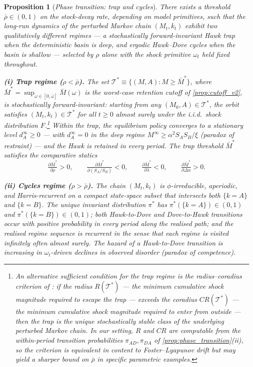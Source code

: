 \documentclass[11pt,twoside]{extarticle}
\newtheorem{proposition}{Proposition}
\begin{document}
\begin{proposition}[\emph{Phase transition: trap and cycles}]\label{prop:phase_transition}\label{prop:trap_v2}\label{prop:cycles_v2}\label{prop:cs_v2}
\emph{There exists a threshold $\bar\rho\in(0,1)$ on the stock-decay rate, depending on model primitives, such that the long-run dynamics of the perturbed Markov chain $(M_t,k_t)$ exhibit two qualitatively different regimes — a stochastically forward-invariant Hawk trap when the deterministic basin is deep, and ergodic Hawk--Dove cycles when the basin is shallow — selected by $\rho$ alone with the shock primitive $\omega_t$ held fixed throughout.}

\smallskip
\noindent\textbf{(i) Trap regime ($\rho<\bar\rho$).} The set $\mathcal T^*\equiv\{(M,A):M\ge\bar M^*\}$, where $\bar M^*=\sup_{\omega\in[0,\bar\omega]}\bar M(\omega)$ is the worst-case retention cutoff of \autoref{prop:cutoff_v2}, is stochastically forward-invariant: starting from any $(M_0,A)\in\mathcal T^*$, the orbit satisfies $(M_t,k_t)\in\mathcal T^*$ for all $t\ge 0$ almost surely under the i.i.d.\ shock distribution $F$.\footnote{An alternative sufficient condition for the trap regime is the radius--coradius criterion of \citet{ellisonLearningLocalInteraction1993}: if the radius $R(\mathcal T^*)$ --- the minimum cumulative shock magnitude required to escape the trap --- exceeds the coradius $CR(\mathcal T^*)$ --- the minimum cumulative shock magnitude required to enter from outside --- then the trap is the unique stochastically stable class of the underlying perturbed Markov chain. In our setting, $R$ and $CR$ are computable from the within-period transition probabilities $\pi_{AD},\pi_{DA}$ of \autoref{prop:phase_transition}(ii), so the criterion is equivalent in content to Foster--Lyapunov drift but may yield a sharper bound on $\bar\rho$ in specific parametric examples.} Within the trap, the equilibrium policy converges to a stationary level $d_A^\infty\ge 0$ — with $d_A^\infty=0$ in the deep regime $M^\infty\ge\alpha^2 S_A S_B/\xi$ (paradox of restraint) — and the Hawk is retained in every period. The trap threshold $\bar M^*$ satisfies the comparative statics
\begin{equation}\label{eq:cs_signs_v2}
    \tfrac{\partial\bar M^*}{\partial\rho}>0,\qquad\tfrac{\partial\bar M^*}{\partial(S_A/S_B)}<0,\qquad\tfrac{\partial\bar M^*}{\partial\lambda}<0,\qquad\tfrac{\partial\bar M^*}{\partial\Delta u}>0.
\end{equation}

\smallskip
\noindent\textbf{(ii) Cycles regime ($\rho>\bar\rho$).} The chain $(M_t,k_t)$ is $\phi$-irreducible, aperiodic, and Harris-recurrent on a compact state-space subset that intersects both $\{k=A\}$ and $\{k=B\}$. The unique invariant distribution $\pi^*$ has $\pi^*(\{k=A\})\in(0,1)$ and $\pi^*(\{k=B\})\in(0,1)$; both Hawk-to-Dove and Dove-to-Hawk transitions occur with positive probability in every period along the realised path; and the realised regime sequence is recurrent in the sense that each regime is visited infinitely often almost surely. The hazard of a Hawk-to-Dove transition is increasing in $\omega_t$-driven declines in observed disorder (paradox of competence).


\end{proposition}
\end{document}
